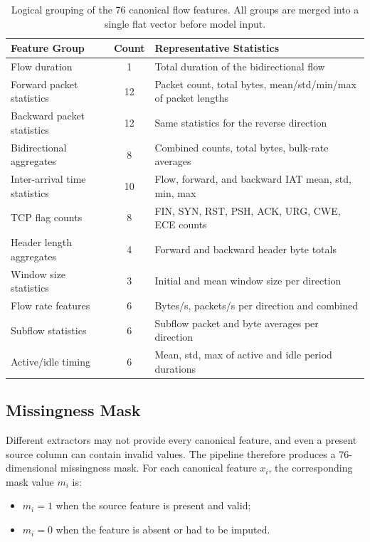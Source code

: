 \begin{table}[htbp]
\centering
\begin{tabular}{lcp{7cm}}
\toprule
Feature Group & Count & Representative Statistics \\
\midrule
Flow duration & 1 & Total duration of the bidirectional flow \\
Forward packet statistics & 12 & Packet count, total bytes, mean/std/min/max of packet lengths \\
Backward packet statistics & 12 & Same statistics for the reverse direction \\
Bidirectional aggregates & 8 & Combined counts, total bytes, bulk-rate averages \\
Inter-arrival time statistics & 10 & Flow, forward, and backward IAT mean, std, min, max \\
TCP flag counts & 8 & FIN, SYN, RST, PSH, ACK, URG, CWE, ECE counts \\
Header length aggregates & 4 & Forward and backward header byte totals \\
Window size statistics & 3 & Initial and mean window size per direction \\
Flow rate features & 6 & Bytes/s, packets/s per direction and combined \\
Subflow statistics & 6 & Subflow packet and byte averages per direction \\
Active/idle timing & 6 & Mean, std, max of active and idle period durations \\
\bottomrule
\end{tabular}
\caption{Logical grouping of the 76 canonical flow features. All groups are merged into a single flat vector before model input.}
\label{tab:canonical-groups}
\end{table}

\subsection{Missingness Mask}
Different extractors may not provide every canonical feature, and even a present source column can contain invalid values. The pipeline therefore produces a 76-dimensional missingness mask. For each canonical feature $x_i$, the corresponding mask value $m_i$ is:
\begin{itemize}
    \item $m_i = 1$ when the source feature is present and valid;
    \item $m_i = 0$ when the feature is absent or had to be imputed.
\end{itemize}

